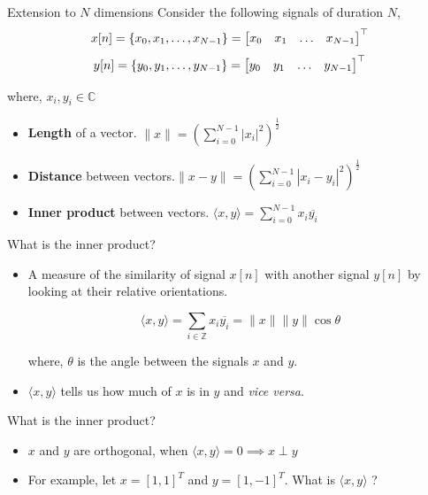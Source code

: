 \documentclass[aspectratio=169]{beamer}
\let\olditem\item
\renewcommand{\item}{\setlength{\itemsep}{\fill}\olditem}
\def\bmx{\ensuremath\begin{bmatrix*}[r]}
\def\emx{\ensuremath\end{bmatrix*}}
\begin{document}
\begin{frame}[t]
\end{frame}

\begin{frame}{Extension to $N$ dimensions}
Consider the following signals of duration $N$,
\[ x[n] = \{x_0, x_1, \ldots, x_{N-1}\} = \bmx x_0 & x_1 & \ldots & x_{N-1}\emx^\top \]
\[ y[n] = \{y_0, y_1, \ldots, y_{N-1}\} = \bmx y_0 & y_1 & \ldots & y_{N-1}\emx^\top \]

where, $x_i, y_i \in \mathbb{C}$

\begin{itemize}
\item \textbf{Length} of a vector. $\|x\| = \left(\sum_{i=0}^{N-1} \left|x_i\right| ^2\right)^{\frac{1}{2}}$
\item \textbf{Distance} between vectors.$\|x - y\| = \left(\sum_{i=0}^{N-1} \left|x_i - y_i\right| ^2\right)^{\frac{1}{2}}$
\item \textbf{Inner product} between vectors. $\langle x, y \rangle = \sum_{i=0}^{N-1}x_i\overline{y_i}$
\end{itemize}
\end{frame}

\begin{frame}[t]{What is the inner product?}
\begin{itemize}
\item A measure of the similarity of signal $x[n]$ with another signal $y[n]$ by looking at their relative orientations.

\[ \langle x,y \rangle = \sum_{i \in \mathbb{Z}} x_i\overline{y_i} = \|x\|\|y\|\cos \theta\]

where, $\theta$ is the angle between the signals $x$ and $y$.

\item $\langle x,y \rangle$ tells us how much of $x$ is in $y$ and \textit{vice versa}.

\end{itemize}
\end{frame}


\begin{frame}[t]{What is the inner product?}
\begin{itemize}
\item $x$ and $y$ are orthogonal, when $\langle x,y \rangle = 0 \implies x \perp y$

\item For example, let $x = \left[1, 1\right]^{T}$ and $y = \left[1, -1\right]^{T}$. What is  $\langle x,y  \rangle$ ?
\end{itemize}
\end{frame}
\end{document}
